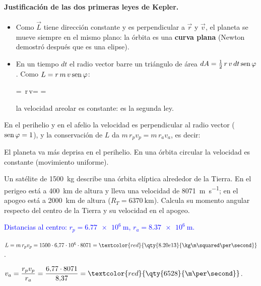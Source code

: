\paragraph{Justificación de las dos primeras leyes de Kepler.}
\begin{itemize}
    \item Como \(\vec L\) tiene dirección constante y es perpendicular a \(\vec r\) y \(\vec v\), el planeta se mueve
    siempre en el mismo plano: la órbita es una \textbf{curva plana} (Newton demostró después que es una elipse).
    \item En un tiempo \(dt\) el radio vector barre un triángulo de área \(dA = \frac{1}{2}\,r\,v\,dt\operatorname{sen}\varphi\). Como
    \(L = r\,m\,v\operatorname{sen}\varphi\):
    \begin{centeredequation}
         = \,r\,v\sen\varphi =  =  \label{eq:grav-areolar}
    \end{centeredequation}
    la velocidad areolar es constante: es la segunda ley.
\end{itemize}
En el perihelio y en el afelio la velocidad es perpendicular al radio vector (\(\operatorname{sen}\varphi = 1\)), y la conservación de
\(L\) da \(m\,r_p v_p = m\,r_a v_a\), es decir:
\begin{centeredequation}
     \label{eq:grav-perihelio}
\end{centeredequation}
El planeta va más deprisa en el perihelio. En una órbita circular la velocidad es constante (movimiento uniforme).

\begin{exercise}
    Un satélite de \qty{1500}{\kg} describe una órbita elíptica alrededor de la Tierra. En el perigeo está a \qty{400}{\km}
    de altura y lleva una velocidad de \qty{8071}{\m\per\second}; en el apogeo está a \qty{2000}{\km} de altura
    (\(R_T = \qty{6370}{\km}\)). Calcula su momento angular respecto del centro de la Tierra y su velocidad en el apogeo.
    \begin{solu}
        \textcolor{blue}{Distancias al centro: \(r_p = \qty{6.77e6}{\m}\), \(r_a = \qty{8.37e6}{\m}\).}

        \(L = m\,r_p v_p = 1500\cdot 6{,}77\cdot 10^6\cdot 8071 = \textcolor{red}{\qty{8.20e13}{\kg\m\squared\per\second}}\).

        \(v_a = \dfrac{r_p v_p}{r_a} = \dfrac{6{,}77\cdot 8071}{8{,}37} = \textcolor{red}{\qty{6528}{\m\per\second}}\).
    \end{solu}
\end{exercise}

